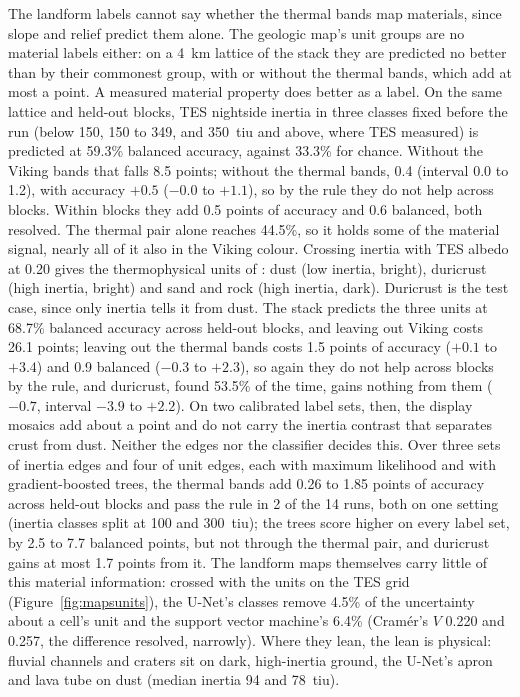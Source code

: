 \documentclass[twocolumn]{aastex701}
\begin{document}
The landform labels cannot say whether the thermal bands map materials, since slope and relief predict them alone.
The geologic map's unit groups \citep{Tanaka2014} are no material
labels either: on a 4~km lattice of the stack they are predicted no better than by their commonest group, with or
without the thermal bands, which add at most a point. A measured material property does better as a label. On the
same lattice and held-out blocks, TES nightside inertia \citep{Putzig2007} in three classes fixed before the run
(below 150, 150 to 349, and 350~tiu and above, where TES measured) is predicted at 59.3\% balanced accuracy, against
33.3\% for chance. Without the Viking bands that falls 8.5 points; without the thermal bands, 0.4 (interval 0.0 to
1.2), with accuracy $+0.5$ ($-0.0$ to $+1.1$), so by the rule they do not help across blocks. Within blocks they add
0.5 points of accuracy and 0.6 balanced, both resolved. The thermal pair alone reaches 44.5\%, so it holds some of
the material signal, nearly all of it also in the Viking colour. Crossing inertia with TES albedo
\citep{Christensen2001} at 0.20 gives the thermophysical units of \citet{Mellon2000}: dust (low inertia, bright),
duricrust (high inertia, bright) and sand and rock (high inertia, dark). Duricrust is the test case, since only inertia
tells it from dust. The stack predicts the three units at 68.7\% balanced accuracy across held-out blocks, and leaving
out Viking costs 26.1 points; leaving out the thermal bands costs 1.5 points of accuracy ($+0.1$ to $+3.4$) and 0.9
balanced ($-0.3$ to $+2.3$), so again they do not help across blocks by the rule, and duricrust, found 53.5\% of the
time, gains nothing from them ($-0.7$, interval $-3.9$ to $+2.2$). On two calibrated label sets, then, the display
mosaics add about a point and do not carry the inertia contrast that separates crust from dust. Neither the edges
nor the classifier decides this. Over three sets of inertia edges and four of unit edges, each with maximum likelihood
and with gradient-boosted trees, the thermal bands add 0.26 to 1.85 points of accuracy across held-out blocks and pass
the rule in 2 of the 14 runs, both on one setting (inertia classes split at 100 and 300~tiu); the trees score higher
on every label set, by 2.5 to 7.7 balanced points, but not through the thermal pair, and duricrust gains at most 1.7
points from it. The landform maps themselves carry little of this material information: crossed with the units on the
TES grid (Figure~\ref{fig:mapsunits}), the U-Net's classes remove 4.5\% of the uncertainty about a cell's unit and the support vector machine's
6.4\% (Cram\'er's $V$ 0.220 and 0.257, the difference resolved, narrowly). Where they lean, the lean is physical:
fluvial channels and craters sit on dark, high-inertia ground, the U-Net's apron and lava tube on dust (median inertia
94 and 78~tiu). %
\end{document}
